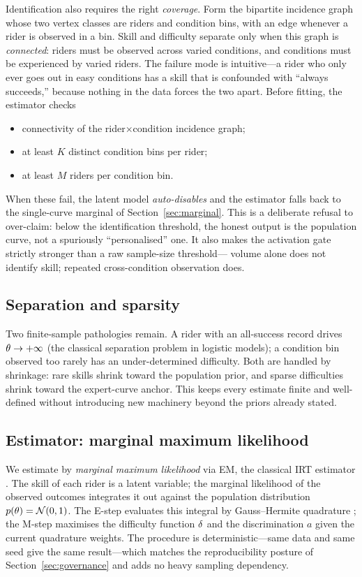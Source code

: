 Identification also requires the right \emph{coverage}. Form the bipartite
incidence graph whose two vertex classes are riders and condition bins, with an
edge whenever a rider is observed in a bin. Skill and difficulty separate only
when this graph is \emph{connected}: riders must be observed across varied
conditions, and conditions must be experienced by varied riders. The failure mode
is intuitive---a rider who only ever goes out in easy conditions has a skill that
is confounded with ``always succeeds,'' because nothing in the data forces the two
apart. Before fitting, the estimator checks
\begin{itemize}
  \item connectivity of the rider${\times}$condition incidence graph;
  \item at least $K$ distinct condition bins per rider;
  \item at least $M$ riders per condition bin.
\end{itemize}
When these fail, the latent model \emph{auto-disables} and the estimator falls
back to the single-curve marginal of Section~\ref{sec:marginal}. This is a
deliberate refusal to over-claim: below the identification threshold, the honest
output is the population curve, not a spuriously ``personalised'' one. It also
makes the activation gate strictly stronger than a raw sample-size threshold---
volume alone does not identify skill; repeated cross-condition observation does.

\subsection{Separation and sparsity}
\label{sec:sep}

Two finite-sample pathologies remain. A rider with an all-success record drives
$\theta \to +\infty$ (the classical separation problem in logistic models); a
condition bin observed too rarely has an under-determined difficulty. Both are
handled by shrinkage: rare skills shrink toward the population prior, and sparse
difficulties shrink toward the expert-curve anchor. This keeps every estimate
finite and well-defined without introducing new machinery beyond the priors
already stated.

\subsection{Estimator: marginal maximum likelihood}
\label{sec:mml}

We estimate by \emph{marginal maximum likelihood} via EM, the classical IRT
estimator \citep{bock1981}. The skill of each rider is a latent variable; the
marginal likelihood of the observed outcomes integrates it out against the
population distribution $p(\theta) = \mathcal{N}(0,1)$. The E-step evaluates this
integral by Gauss--Hermite quadrature \citep{golub1969}; the M-step maximises the
difficulty function $\delta$ and the discrimination $a$ given the current
quadrature weights. The procedure is deterministic---same data and same seed give
the same result---which matches the reproducibility posture of
Section~\ref{sec:governance} and adds no heavy sampling dependency.

